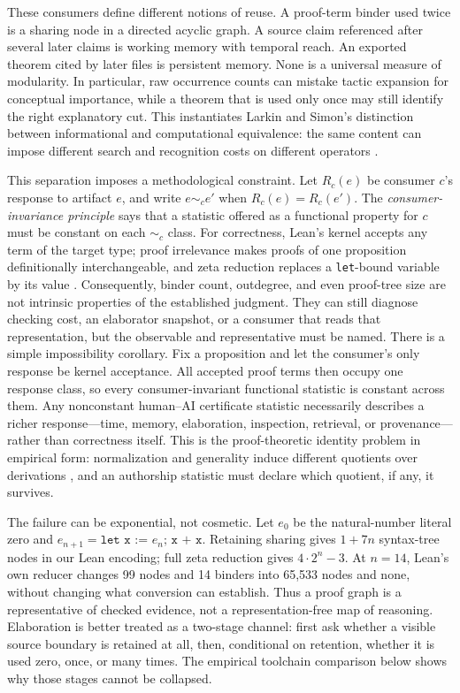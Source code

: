 \documentclass[10pt]{article}
\newcommand{\code}[1]{\texttt{#1}}
\begin{document}
These consumers define different notions of reuse.  A proof-term binder used twice is a sharing
node in a directed acyclic graph.  A source claim referenced after several later claims is working
memory with temporal reach.  An exported theorem cited by later files is persistent memory.  None
is a universal measure of modularity.  In particular, raw occurrence counts can mistake tactic
expansion for conceptual importance, while a theorem that is used only once may still identify the
right explanatory cut.  This instantiates Larkin and Simon's distinction between informational and
computational equivalence: the same content can impose different search and recognition costs on
different operators \citep{larkin1987}.

This separation imposes a methodological constraint.  Let $R_c(e)$ be consumer $c$'s response to
artifact $e$, and write $e\sim_c e'$ when $R_c(e)=R_c(e')$.  The \emph{consumer-invariance
principle} says that a statistic offered as a functional property for $c$ must be constant on each
$\sim_c$ class.  For correctness, Lean's kernel accepts any term of the target type;
proof irrelevance makes proofs of one proposition definitionally interchangeable, and zeta reduction
replaces a \code{let}-bound variable by its value \citep{leanreference}.  Consequently, binder count,
outdegree, and even proof-tree size are not intrinsic properties of the established judgment.  They
can still diagnose checking cost, an elaborator snapshot, or a consumer that reads that
representation, but the observable and representative must be named.
There is a simple impossibility corollary.  Fix a proposition and let the consumer's only response
be kernel acceptance.  All accepted proof terms then occupy one response class, so every
consumer-invariant functional statistic is constant across them.  Any nonconstant human--AI
certificate statistic necessarily describes a richer response---time, memory, elaboration,
inspection, retrieval, or provenance---rather than correctness itself.
This is the proof-theoretic identity problem in empirical form: normalization and generality induce
different quotients over derivations \citep{dosen2004}, and an authorship statistic must declare which
quotient, if any, it survives.

The failure can be exponential, not cosmetic.  Let $e_0$ be the natural-number literal zero and
$e_{n+1}=\code{let x := }e_n\code{; x + x}$.  Retaining sharing gives $1+7n$ syntax-tree nodes in
our Lean encoding; full zeta reduction gives $4\cdot2^n-3$.  At $n=14$, Lean's own reducer changes
99 nodes and 14 binders into 65,533 nodes and none, without changing what conversion can establish.
Thus a proof graph is a representative of checked evidence, not a representation-free map of
reasoning.  Elaboration is better treated as a two-stage channel: first ask whether a visible source
boundary is retained at all, then, conditional on retention, whether it is used zero, once, or many
times.  The empirical toolchain comparison below shows why those stages cannot be collapsed.
\end{document}
